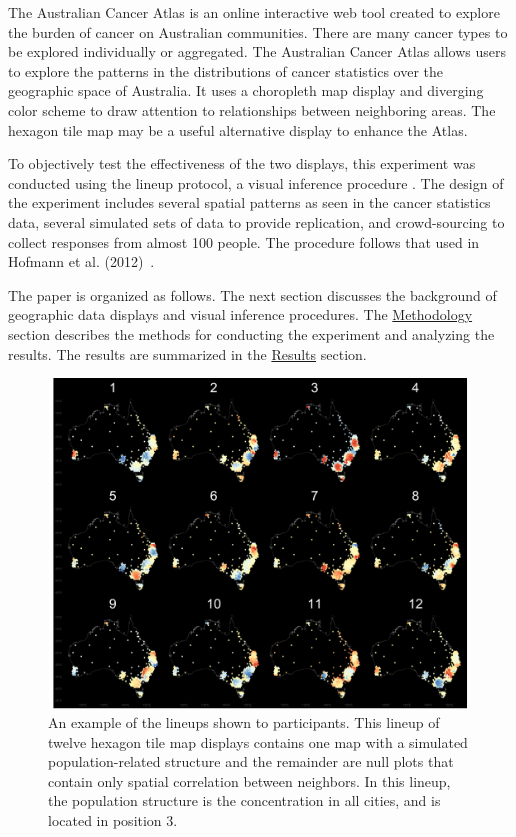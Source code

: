 \documentclass[journal]{vgtc}                     %
\begin{document}
The Australian Cancer Atlas \cite{atlas} is an online interactive web tool created to explore the burden of cancer on Australian communities. There are many cancer types to be explored individually or aggregated. The Australian Cancer Atlas allows users to explore the patterns in the distributions of cancer statistics over the geographic space of Australia. It uses a choropleth map display and diverging color scheme to draw attention to relationships between neighboring areas. The hexagon tile map may be a useful alternative display to enhance the Atlas.

To objectively test the effectiveness of the two displays, this experiment was conducted using the lineup protocol, a visual inference procedure \cite{GIIV}. The design of the experiment includes several spatial patterns as seen in the cancer statistics data, several simulated sets of data to provide replication, and crowd-sourcing to collect responses from almost 100 people. The procedure follows that used in Hofmann et al. (2012)~\cite{GTPCCD}. 

The paper is organized as follows. The next section discusses the background of geographic data displays and visual inference procedures. The \protect\hyperlink{methodology}{Methodology} section describes the methods for conducting the experiment and analyzing the results. The results are summarized in the \protect\hyperlink{results}{Results} section.

\begin{figure}[t]
\centering
\includegraphics[width=0.9\linewidth]{paper_files/figure-latex/lineup-1} \caption{An example of the lineups shown to participants. This lineup of twelve hexagon tile map displays contains one map with a simulated population-related structure and the remainder are null plots that contain only spatial correlation between neighbors. In this lineup, the population structure is the concentration in all cities, and is located in position 3.}\label{fig:lineup}
\end{figure}
\end{document}
